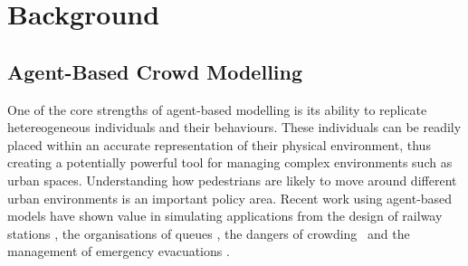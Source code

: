 \section{Background\label{background}}

\subsection{Agent-Based Crowd Modelling}

One of the core strengths of agent-based modelling is its ability to replicate hetereogeneous individuals and their behaviours.  These individuals can be readily placed within an accurate representation of their physical environment, thus creating a potentially powerful tool for managing complex environments such as urban spaces. Understanding how pedestrians are likely to move around different urban environments is an important policy area.  Recent work using agent-based models have shown value in simulating applications from the design of railway stations \citep{klugl_largescale_2007, chen_multiagentbased_2017}, the organisations of queues \citep{kim_modeling_2013}, the dangers of crowding~\citep{helbing_simulating_2000} and the management of emergency evacuations \citep{vanderwal_simulating_2017}.

%	
%	


